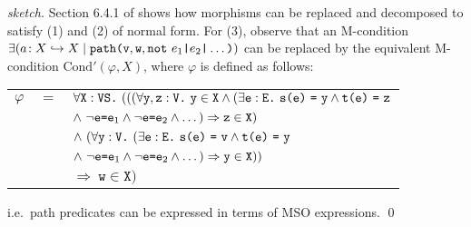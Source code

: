 \documentclass{llncs}
\newcommand{\mt}[1]{\text{\tt{#1}}}
\begin{document}
	\begin{proof}[sketch]\rm
		Section 6.4.1 of \cite{Poskitt13a} shows how morphisms can be replaced and decomposed to satisfy (1) and (2) of normal form. For (3), observe that an M-condition $\exists(a\!:X\hookrightarrow X \mid \mathtt{path}\mt{(}\mathtt{v,w,not\ }e_1\mt{|}e_2\mt{|}\dots                                                                                                                                                        \mt{)})$ can be replaced by the equivalent M-condition $\text{Cond}'(\varphi,X)$, where $\varphi$ is defined as follows:\\
		
		\begin{center}\begin{tabular}{r c l}
			$\varphi$ &$=$& \vspace{5pt}$\forall\mathtt{X}:\mathtt{VS}\mt{.}\ (( (\forall\mathtt{y,z}:\mathtt{V}\mt{.}\ \mathtt{y}\in\mathtt{X} \wedge (\exists\mathtt{e}:\mathtt{E}\mt{.}\ \mathtt{s}\mt{(}\mathtt{e}\mt{)}\ \mt{=}\ \mathtt{y} \wedge \mathtt{t}\mt{(}\mathtt{e}\mt{)}\ \mt{=}\ \mathtt{z}$\\
			
			&& \vspace{5pt}\hspace{0.5in}$\wedge\ \neg\mathtt{e}\mt{=}\mathtt{e}_1 \wedge \neg\mathtt{e}\mt{=}\mathtt{e}_2\wedge\dots)\Rightarrow \mathtt{z}\in\mathtt{X})$\\
			
			&& \vspace{5pt}\hspace{0.25in}$\wedge\ (\forall\mathtt{y}:\mathtt{V}\mt{.}\ (\exists\mathtt{e}:\mathtt{E}\mt{.}\ \mathtt{s}\mt{(}\mathtt{e}\mt{)}\ \mt{=}\ \mathtt{v} \wedge \mathtt{t}\mt{(}\mathtt{e}\mt{)}\ \mt{=}\ \mathtt{y}$\\
			
			&& \vspace{5pt}\hspace{0.5in}$\wedge\ \neg\mathtt{e}\mt{=}\mathtt{e}_1 \wedge \neg\mathtt{e}\mt{=}\mathtt{e}_2\wedge\dots) \Rightarrow \mathtt{y}\in\mathtt{X}))$\\
			
			&& \vspace{5pt}\hspace{0.25in}$\Rightarrow\ \mathtt{w}\in\mathtt{X} )$
		\end{tabular}\end{center}
		
		\noindent i.e.\ path predicates can be expressed in terms of MSO expressions.
			\qed
	\end{proof}
	
\end{document}
